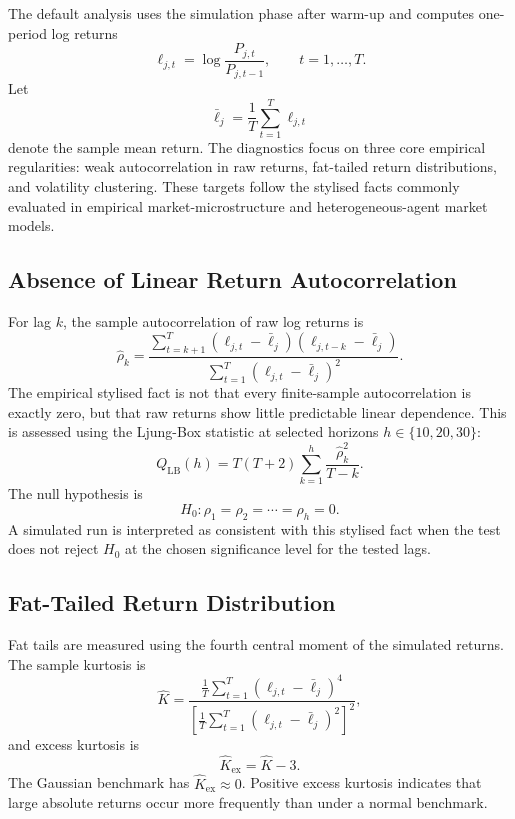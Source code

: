 \documentclass[12pt, a4paper]{article}
\begin{document}
    The default analysis uses the simulation phase after warm-up and computes
    one-period log returns
    \[
        \ell_{j,t}=\log\frac{P_{j,t}}{P_{j,t-1}},
        \qquad t=1,\ldots,T.
    \]
    Let
    \[
        \bar\ell_j=\frac{1}{T}\sum_{t=1}^{T}\ell_{j,t}
    \]
    denote the sample mean return. The diagnostics focus on three core empirical
    regularities: weak autocorrelation in raw returns, fat-tailed return
    distributions, and volatility clustering. These targets follow the stylised
    facts commonly evaluated in empirical market-microstructure and
    heterogeneous-agent market models.

    \subsection{Absence of Linear Return Autocorrelation}

    For lag \(k\), the sample autocorrelation of raw log returns is
    \[
        \hat\rho_k
        =
        \frac{\sum_{t=k+1}^{T}\left(\ell_{j,t}-\bar\ell_j\right)\left(\ell_{j,t-k}-\bar\ell_j\right)}
        {\sum_{t=1}^{T}{\left(\ell_{j,t}-\bar\ell_j\right)}^2}.
    \]
    The empirical stylised fact is not that every finite-sample autocorrelation is
    exactly zero, but that raw returns show little predictable linear dependence.
    This is assessed using the Ljung-Box statistic at selected horizons
    \(h\in\{10,20,30\}\):
    \[
        Q_{\mathrm{LB}}(h)
        =
        T(T+2)\sum_{k=1}^{h}\frac{\hat\rho_k^2}{T-k}.
    \]
    The null hypothesis is
    \[
        H_0:\rho_1=\rho_2=\cdots=\rho_h=0.
    \]
    A simulated run is interpreted as consistent with this stylised fact when the
    test does not reject \(H_0\) at the chosen significance level for the tested
    lags.

    \subsection{Fat-Tailed Return Distribution}

    Fat tails are measured using the fourth central moment of the simulated
    returns. The sample kurtosis is
    \[
        \widehat K
        =
        \frac{\frac{1}{T}\sum_{t=1}^{T}{\left(\ell_{j,t}-\bar\ell_j\right)}^4}
        {{\left[\frac{1}{T}\sum_{t=1}^{T}{\left(\ell_{j,t}-\bar\ell_j\right)}^2\right]}^2},
    \]
    and excess kurtosis is
    \[
        \widehat K_{\mathrm{ex}}=\widehat K-3.
    \]
    The Gaussian benchmark has \(\widehat K_{\mathrm{ex}}\approx 0\). Positive
    excess kurtosis indicates that large absolute returns occur more frequently
    than under a normal benchmark.
\end{document}
